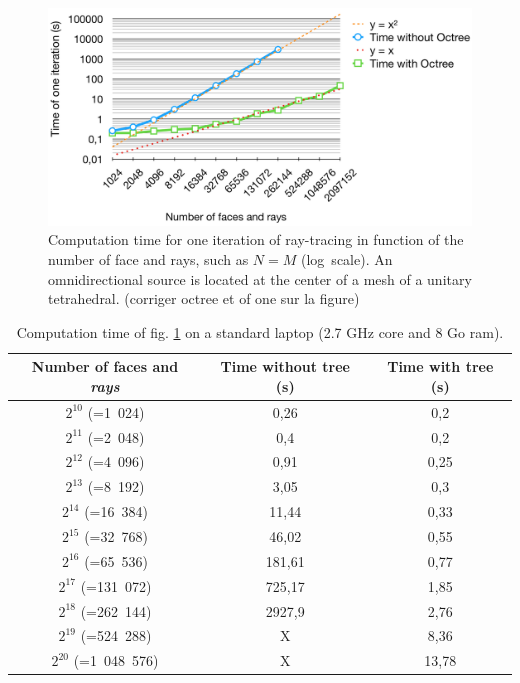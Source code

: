 \documentclass[AMA,STIX1COL]{WileyNJD-v2}
\begin{document}
\begin{figure}[t]
\centering
	\includegraphics[width=0.8\linewidth]{times}
	\caption{Computation time for one iteration of ray-tracing in function of the number of face and rays, such as $N = M$ (log~scale). An omnidirectional source is located at the center of a mesh of a unitary tetrahedral. (corriger octree et of one sur la figure)}
	\label{times}
\end{figure}
%
\begin{table}[t]
\centering
	\begin{tabular}{| c | c | c |}
		\hline
		Number of faces and \textit{rays} & Time \textbf{without} tree (s) & Time \textbf{with} tree (s)\\
		  \hline
		  \hline
		   $2^{10}$ (=1~024) & 0,26 &	0,2 \\
		   \hline
		$2^{11}$ (=2~048)  & 0,4	& 0,2 \\
		   \hline
		$2^{12}$ (=4~096) & 0,91	& 0,25\\
		   \hline
		$2^{13}$ (=8~192) & 3,05 &	0,3\\
		   \hline
		$2^{14}$ (=16~384) & 11,44	&0,33\\
		   \hline
		$2^{15}$ (=32~768) & 46,02	&0,55 \\
		     \hline
		    $2^{16}$ (=65~536) & 181,61	& 0,77\\
		   \hline
		$2^{17}$ (=131~072) & 725,17	& 1,85\\
		\hline
		$2^{18}$ (=262~144) & 2927,9 & 2,76 \\
		\hline
		$2^{19}$ (=524~288) & X & 8,36 \\
		\hline
		$2^{20}$ (=1~048~576) & X & 13,78 \\
		\hline
	 \end{tabular}
	\caption{Computation time of fig. \ref{times} on a standard laptop (2.7 GHz core and 8 Go ram).}
	\label{tabComplexite}
\end{table}
\end{document}
